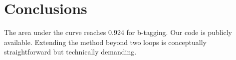 \section{Conclusions}\label{sec:conclusions}

The area under the curve reaches 0.924 for b-tagging. Our code is
publicly available. Extending the method beyond two loops is
conceptually straightforward but technically demanding.

